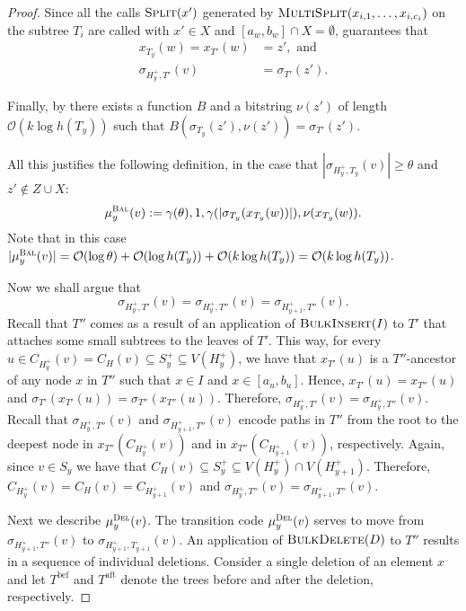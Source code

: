 \documentclass[kpfonts]{patmorin}
\newcommand{\Oh}{\mathcal{O}}
\let\geq\geqslant
\begin{document}
\begin{proof}
  Since all the calls $\textsc{Split}(x')$ generated by $\textsc{MultiSplit}(x_{i,1},\dots,x_{i,c_i})$ on the subtree $T_{i}$ are called with $x'\in X$ and $[a_w,b_w]\cap X =\emptyset$,  guarantees that 
  \begin{align*}
  x_{T_y}(w) = x_{T'}(w) &= z', \textrm{ and}\\
  \sigma_{H^+_y,T'}(v) &= \sigma_{T'}(z').
  \end{align*}

  Finally, by  there exists a function $B$ and a bitstring 
  $\nu(z')$ of length $\Oh(k\log h(T_y))$ such that $B(\sigma_{T_y}(z'), \nu(z')) = \sigma_{T'}(z')$. 

  All this justifies the following definition, in the case that $|\sigma_{H^+_{y},T_{y}}(v)| \geq \theta$ and $z'\not\in Z\cup X$:
  \[
   \mu_y^{\textsc{Bal}}(v) := \gamma(\theta),1,\gamma(|\sigma_{T_y}(x_{T_y}(w))|),\nu(x_{T_y}(w)).
  \]
  Note that in this case $|\mu_y^{\textsc{Bal}}(v)|=\Oh(\log\theta)+\Oh(\log h(T_y)) + \Oh(k\log h(T_y)) = \Oh(k\log h(T_y))$.



  Now we shall argue that
  \[
  \sigma_{H^+_{y},T'}(v) = \sigma_{H^+_{y},T''}(v) = \sigma_{H^+_{y+1},T''}(v).
  \]
  Recall that $T''$ comes as a result of an application of $\textsc{BulkInsert}(I)$ to $T'$ 
  that attaches some small subtrees to the leaves of $T'$. 
  This way, for every $u \in C_{H_y^+}(v) = C_H(v) \subseteq S^+_y \subseteq V(H^+_y)$, 
  we have that $x_{T'}(u)$ is a $T''$-ancestor of any node $x$ in $T''$ such that 
  $x\in I$ and $x\in [a_u,b_u]$.
  Hence, $x_{T'}(u) = x_{T''}(u)$ and 
  $\sigma_{T'}(x_{T'}(u)) = \sigma_{T''}(x_{T''}(u))$.
  Therefore, 
  $\sigma_{H^+_{y},T'}(v) =  \sigma_{H^+_{y},T''}(v)$.
  Recall that $\sigma_{H^+_{y},T''}(v)$ and $\sigma_{H^+_{y+1},T''}(v)$ encode paths in $T''$ from the root to the deepest node in $x_{T''}(C_{H^+_{y}}(v))$ and in $x_{T''}(C_{H^+_{y+1}}(v))$, respectively. 
  Again, since $v\in S_y$ we have that $C_H(v)\subseteq S^+_y \subseteq V(H^+_y) \cap V(H^+_{y+1})$. Therefore, 
  $C_{H^+_{y}}(v) = C_H(v) = C_{H^+_{y+1}}(v)$ and $\sigma_{H^+_{y},T''}(v) =\sigma_{H^+_{y+1},T''}(v)$.

  Next we describe $\mu_y^{\textsc{Del}}(v)$. 
  The transition code $\mu_y^{\textsc{Del}}(v)$ serves to move 
  from $\sigma_{H^+_{y+1},T''}(v)$ to $\sigma_{H^+_{y+1},T_{y+1}}(v)$. 
  An application of $\textsc{BulkDelete}(D)$ to $T''$ results in 
  a sequence of individual deletions.
  Consider a single deletion of an element $x$ and let $T^{\text{bef}}$ and $T^{\text{aft}}$ denote the trees before and after the deletion, respectively.


\end{proof}
\end{document}
